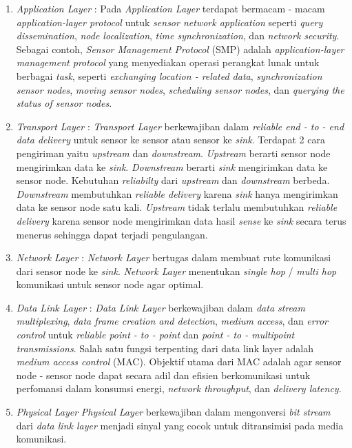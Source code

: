 \begin{enumerate}
	\item {\it Application Layer} : 
	Pada {\it Application Layer} terdapat bermacam - macam {\it application-layer protocol} untuk {\it sensor network application} seperti {\it query dissemination}, {\it node localization}, {\it time synchronization}, dan {\it network security}. Sebagai contoh, {\it Sensor Management Protocol} (SMP) adalah {\it application-layer management protocol} yang menyediakan operasi perangkat lunak untuk berbagai {\it task}, seperti {\it exchanging location - related data}, {\it synchronization sensor nodes}, {\it moving  sensor nodes}, {\it scheduling sensor nodes}, dan {\it querying the status of sensor nodes}. 
	\item {\it Transport Layer} : 
	{\it Transport Layer} berkewajiban dalam {\it reliable end - to - end data delivery} untuk sensor ke sensor atau sensor ke {\it sink}. Terdapat 2 cara pengiriman yaitu {\it upstream} dan {\it downstream}. {\it Upstream} berarti sensor node mengirimkan data ke {\it sink}. {\it Downstream} berarti {\it sink} mengirimkan data ke sensor node. Kebutuhan {\it reliabilty} dari {\it upstream} dan {\it downstream} berbeda. {\it Downstream} membutuhkan {\it reliable delivery} karena {\it sink} hanya mengirimkan data ke sensor node satu kali. {\it Upstream} tidak terlalu membutuhkan {\it reliable delivery} karena sensor node mengirimkan data hasil {\it sense} ke {\it sink} secara terus menerus sehingga dapat terjadi pengulangan.
	\item {\it Network Layer} : 
	{\it Network Layer} bertugas dalam membuat rute komunikasi dari sensor node ke {\it sink}. {\it Network Layer} menentukan {\it single hop} / {\it multi hop} komunikasi untuk sensor node agar optimal.
	\item {\it Data Link Layer} : 
	{\it Data Link Layer} berkewajiban dalam {\it data stream multiplexing}, {\it data frame creation and detection}, {\it medium access}, dan {\it error control} untuk {\it reliable point - to - point} dan {\it point - to - multipoint transmissions}. Salah satu fungsi terpenting dari data link layer adalah {\it medium access control} (MAC). Objektif utama dari MAC adalah agar sensor node - sensor node dapat secara adil dan efisien berkomunikasi untuk perfomansi dalam konsumsi energi, {\it network throughput}, dan {\it delivery latency}.
	\item {\it Physical Layer}
	{\it Physical Layer} berkewajiban dalam mengonversi {\it bit stream} dari {\it data link layer} menjadi sinyal yang cocok untuk ditransimisi pada media komunikasi.
\end{enumerate}

